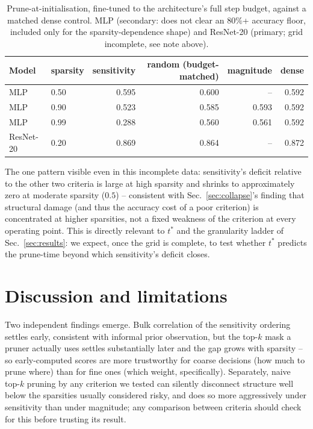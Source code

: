 \documentclass{article}
\begin{document}
\begin{table}[h]
  \caption{Prune-at-initialisation, fine-tuned to the architecture's full step budget,
  against a matched dense control. MLP (secondary: does not clear an $80\%$+ accuracy
  floor, included only for the sparsity-dependence shape) and ResNet-20 (primary; grid
  incomplete, see note above).}
  \label{tab:consequence}
  \centering
  \small
  \begin{tabular}{llrrrr}
    \toprule
    Model & sparsity & sensitivity & random (budget-matched) & magnitude & dense \\
    \midrule
    MLP       & 0.50 & 0.595 & 0.600 & --    & 0.592 \\
    MLP       & 0.90 & 0.523 & 0.585 & 0.593 & 0.592 \\
    MLP       & 0.99 & 0.288 & 0.560 & 0.561 & 0.592 \\
    ResNet-20 & 0.20 & 0.869 & 0.864 & --    & 0.872 \\
    \bottomrule
  \end{tabular}
\end{table}

The one pattern visible even in this incomplete data: sensitivity's deficit relative to the
other two criteria is large at high sparsity and shrinks to approximately zero at moderate
sparsity ($0.5$) -- consistent with Sec.~\ref{sec:collapse}'s finding that structural
damage (and thus the accuracy cost of a poor criterion) is concentrated at higher
sparsities, not a fixed weakness of the criterion at every operating point. This is
directly relevant to $t^*$ and the granularity ladder of Sec.~\ref{sec:results}: we expect,
once the grid is complete, to test whether $t^*$ predicts the prune-time beyond which
sensitivity's deficit closes.

\section{Discussion and limitations}

Two independent findings emerge. Bulk correlation of the sensitivity ordering settles
early, consistent with informal prior observation, but the top-$k$ mask a pruner actually
uses settles substantially later and the gap grows with sparsity -- so early-computed
scores are more trustworthy for coarse decisions (how much to prune where) than for fine
ones (which weight, specifically). Separately, naive top-$k$ pruning by any criterion we
tested can silently disconnect structure well below the sparsities usually considered
risky, and does so more aggressively under sensitivity than under magnitude; any
comparison between criteria should check for this before trusting its result.
\end{document}
